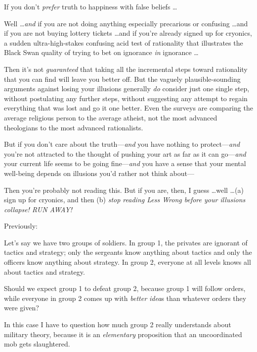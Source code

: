 {
 If you don't \textit{prefer} truth to happiness
with false beliefs \ldots}

{
 Well \ldots \textit{and} if you are not doing anything especially
precarious or confusing \ldots and if you are not buying lottery tickets
\ldots and if you're already signed up for cryonics, a
sudden ultra-high-stakes confusing acid test of rationality that
illustrates the Black Swan quality of trying to bet on ignorance
\textit{in} ignorance \ldots}

{
 Then it's not \textit{guaranteed} that taking all
the incremental steps toward rationality that you can find will leave
you better off. But the vaguely plausible-sounding arguments against
losing your illusions generally \textit{do} consider just one single
step, without postulating any further steps, without suggesting any
attempt to regain everything that was lost and go it one better. Even
the surveys are comparing the average religious person to the average
atheist, not the most advanced theologians to the most advanced
rationalists.}

{
 But if you don't care about the
truth---\textit{and} you have nothing to protect---\textit{and}
you're not attracted to the thought of pushing your art
as far as it can go---\textit{and} your current life seems to be going
fine---\textit{and} you have a sense that your mental well-being
depends on illusions you'd rather not think about---}

{
 Then you're probably not reading this. But if you
are, then, I guess \ldots well \ldots (a) sign up for cryonics, and then
(b) \textit{stop reading Less Wrong before your illusions collapse! RUN
AWAY!}}

\myendsectiontext


{
 Previously:}

{
 Let's say we have two groups of soldiers. In group
1, the privates are ignorant of tactics and strategy; only the
sergeants know anything about tactics and only the officers know
anything about strategy. In group 2, everyone at all levels knows all
about tactics and strategy.}

{
 Should we expect group 1 to defeat group 2, because group 1 will
follow orders, while everyone in group 2 comes up with \textit{better
idea}s than whatever orders they were given?}

{
 In this case I have to question how much group 2 really
understands about military theory, because it is an \textit{elementary}
proposition that an uncoordinated mob gets slaughtered.}

